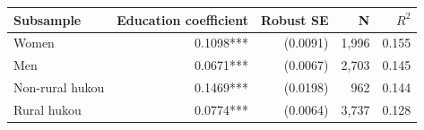 \begin{tabular}{lrrrr}
\toprule
Subsample & Education coefficient & Robust SE & N & $R^2$ \\
\midrule
Women & 0.1098*** & (0.0091) & 1,996 & 0.155 \\
Men & 0.0671*** & (0.0067) & 2,703 & 0.145 \\
Non-rural hukou & 0.1469*** & (0.0198) & 962 & 0.144 \\
Rural hukou & 0.0774*** & (0.0064) & 3,737 & 0.128 \\
\bottomrule
\end{tabular}
